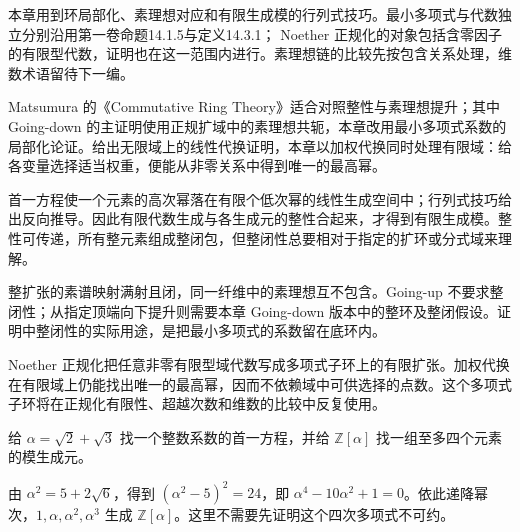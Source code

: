 本章用到环局部化、素理想对应和有限生成模的行列式技巧。最小多项式与代数独立分别沿用第一卷命题14.1.5与定义14.3.1； Noether 正规化的对象包括含零因子的有限型代数，证明也在这一范围内进行。素理想链的比较先按包含关系处理，维数术语留待下一编。

\ProseParagraphBreak
Matsumura 的《Commutative Ring Theory》\cite[§9, Theorems 9.1--9.4, pp. 64--68]{Matsumura1989CommutativeRingTheory}适合对照整性与素理想提升；其中 Going-down 的主证明使用正规扩域中的素理想共轭，本章改用最小多项式系数的局部化论证。\cite[§33, Lemma 2, p. 262]{Matsumura1989CommutativeRingTheory}给出无限域上的线性代换证明，本章以加权代换同时处理有限域：给各变量选择适当权重，便能从非零关系中得到唯一的最高幂。






\begin{chaptersummary}
	首一方程使一个元素的高次幂落在有限个低次幂的线性生成空间中；行列式技巧给出反向推导。因此有限代数生成与各生成元的整性合起来，才得到有限生成模。整性可传递，所有整元素组成整闭包，但整闭性总要相对于指定的扩环或分式域来理解。

	\ProseParagraphBreak
	整扩张的素谱映射满射且闭，同一纤维中的素理想互不包含。Going-up 不要求整闭性；从指定顶端向下提升则需要本章 Going-down 版本中的整环及整闭假设。证明中整闭性的实际用途，是把最小多项式的系数留在底环内。

	\ProseParagraphBreak
	Noether 正规化把任意非零有限型域代数写成多项式子环上的有限扩张。加权代换在有限域上仍能找出唯一的最高幂，因而不依赖域中可供选择的点数。这个多项式子环将在正规化有限性、超越次数和维数的比较中反复使用。
\end{chaptersummary}

\BookExercises

\begin{exercise}\label{b3:ex:05-sum-radicals}
	给 \(\alpha=\sqrt2+\sqrt3\) 找一个整数系数的首一方程，并给 \(\mathbb Z[\alpha]\) 找一组至多四个元素的模生成元。
\end{exercise}
\begin{solution}
	由 \(\alpha^2=5+2\sqrt6\)，得到 \((\alpha^2-5)^2=24\)，即 \(\alpha^4-10\alpha^2+1=0\)。依此递降幂次，\(1,\alpha,\alpha^2,\alpha^3\) 生成 \(\mathbb Z[\alpha]\)。这里不需要先证明这个四次多项式不可约。
\end{solution}

